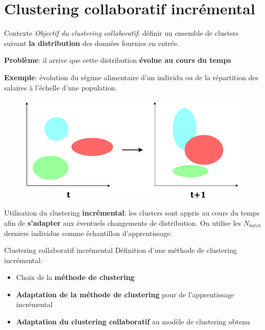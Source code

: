 \documentclass[hyperref={pdfpagelabels=false}]{beamer}
\begin{document}
    \section{Clustering collaboratif incrémental}
        \begin{frame}{Contexte}
            \textit{Objectif du clustering collaboratif}: définir un ensemble de 
            clusters suivant \textbf{la distribution} des données fournies en 
            entrée.

            \textbf{Problème}: il arrive que cette distribution \textbf{évolue 
            au cours du temps}

            \textbf{Exemple}: évolution du régime alimentaire d'un individu ou 
            de la répartition des salaires à l'échelle d'une population.

            \begin{figure}[b]
                \centering
                \includegraphics[scale=.2]{changedistrib}
            \end{figure}

            Utilisation du clustering \textbf{incrémental}: les clusters sont 
            appris au cours du temps afin de \textbf{s'adapter} aux éventuels 
            changements de distribution. On utilise les $N_{batch}$ derniers 
            individus comme échantillon d'apprentissage.

        \end{frame}

        \begin{frame}{Clustering collaboratif incrémental}
            Définition d'une méthode de clustering incrémental:
            \begin{itemize}
                \item<2-> Choix de la \textbf{méthode de clustering}
                \item<3-> \textbf{Adaptation de la méthode de clustering} pour 
                    de l'apprentissage incrémental
                \item<4-> \textbf{Adaptation du clustering collaboratif} au 
                    modèle de clustering obtenu
            \end{itemize}
        \end{frame}
\end{document}
